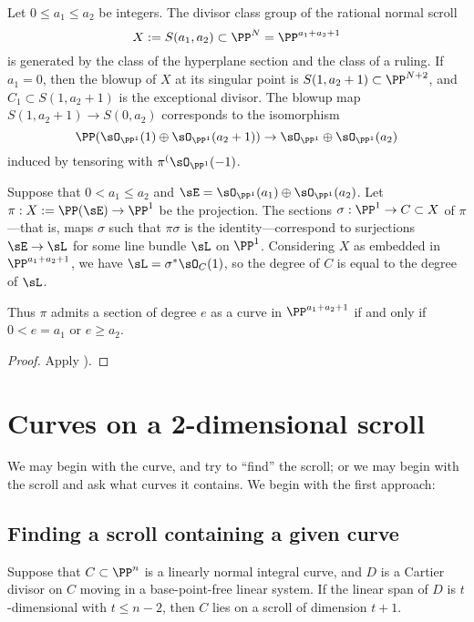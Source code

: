 \begin{corollary}\cite[****]{Hartshorne1977}
Let $0\leq a_1\leq a_2$ be integers. The divisor class group of the 
rational normal scroll 
$$
X:=S(a_1,a_2) \subset \PP^N = \PP^{a_1+a_2+1}
$$
is generated by the class of the hyperplane section and the class
of a ruling. If $a_1 = 0$, then the blowup of $X$ at its singular point is $S(1, a_2+1)\subset \PP^{N+2}$,
and $C_1\subset S(1, a_2+1)$ is the exceptional divisor. The blowup map $S(1, a_2+1) \to S(0,a_2)$
corresponds to the isomorphism 
$$
\PP(\sO_{\PP^1}(1) \oplus \sO_{\PP^1}(a_2+1)) \to \sO_{\PP^1} \oplus \sO_{\PP^1}(a_2)
$$
induced by tensoring with $\pi^(\sO_{\PP^1}(-1)$.
\end{corollary}

\begin{proposition} Suppose that $0<a_1\leq a_2$ and
$\sE = \sO_{\PP^1}(a_1)\oplus \sO_{\PP^1}(a_2)$. Let $\pi: X:= \PP(\sE) \to \PP^1$ be the projection.
The sections $\sigma:\PP^1 \to C\subset X$ of $\pi$---that is, maps $\sigma$ such that $\pi\sigma$ is the 
identity---correspond to surjections
$\sE \to \sL$ for some line bundle $\sL$ on $\PP^1$. Considering  $X$ as embedded in 
$\PP^{a_1+a_2+1}$, we have $\sL = \sigma^*\sO_C(1)$, so the degree of $C$ is equal
to the degree of $\sL$.

Thus $\pi$ admits a section of degree $e$ as a curve in $\PP^{a_1+a_2+1}$ if and only if
$0<e = a_1$ or $e\geq a_2$.
\end{proposition}

\begin{proof}
Apply \cite[II.7.12]{Hartshorne1977}).
\end{proof}

\section{Curves on a 2-dimensional scroll}\label{curves on scrolls}

We may begin with the curve, and try to ``find'' the scroll; or we may begin with the scroll and ask
what curves it contains. We begin with the first approach:


\subsection{Finding a scroll containing a given curve}

\begin{proposition}
Suppose that $C\subset \PP^n$ is a linearly normal integral curve, and $D$ is a  Cartier divisor on $C$ moving in a base-point-free linear system. If the linear span of $D$ is $t$-dimensional with $t\leq n-2$, then $C$ lies on a scroll of dimension $t+1$.
\end{proposition}


